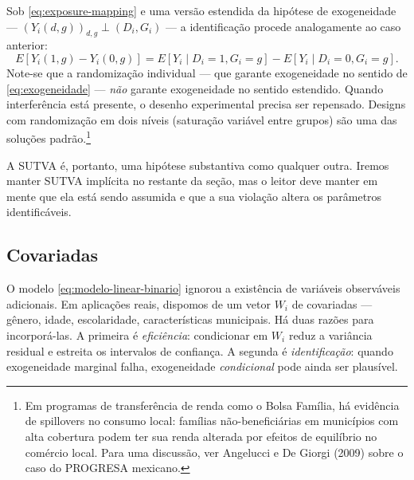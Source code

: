 Sob \eqref{eq:exposure-mapping} e uma versão estendida da hipótese de exogeneidade --- $(Y_i(d, g))_{d, g} \perp (D_i, G_i)$ --- a identificação procede analogamente ao caso anterior:
\begin{equation}
E[Y_i(1, g) - Y_i(0, g)] = E[Y_i \mid D_i = 1, G_i = g] - E[Y_i \mid D_i = 0, G_i = g].
\label{eq:identificacao-spillover}
\end{equation}
Note-se que a randomização individual --- que garante exogeneidade no sentido de \eqref{eq:exogeneidade} --- \textit{não} garante exogeneidade no sentido estendido. Quando interferência está presente, o desenho experimental precisa ser repensado. Designs com randomização em dois níveis (saturação variável entre grupos) são uma das soluções padrão.\footnote{Em programas de transferência de renda como o Bolsa Família, há evidência de spillovers no consumo local: famílias não-beneficiárias em municípios com alta cobertura podem ter sua renda alterada por efeitos de equilíbrio no comércio local. Para uma discussão, ver Angelucci e De Giorgi (2009) sobre o caso do PROGRESA mexicano.}

A SUTVA é, portanto, uma hipótese substantiva como qualquer outra. Iremos manter SUTVA implícita no restante da seção, mas o leitor deve manter em mente que ela está sendo assumida e que a sua violação altera os parâmetros identificáveis.

\subsection{Covariadas}
\label{subsubsec:covariadas}

O modelo \eqref{eq:modelo-linear-binario} ignorou a existência de variáveis observáveis adicionais. Em aplicações reais, dispomos de um vetor $W_i$ de covariadas --- gênero, idade, escolaridade, características municipais. Há duas razões para incorporá-las. A primeira é \textit{eficiência}: condicionar em $W_i$ reduz a variância residual e estreita os intervalos de confiança. A segunda é \textit{identificação}: quando exogeneidade marginal falha, exogeneidade \textit{condicional} pode ainda ser plausível.


